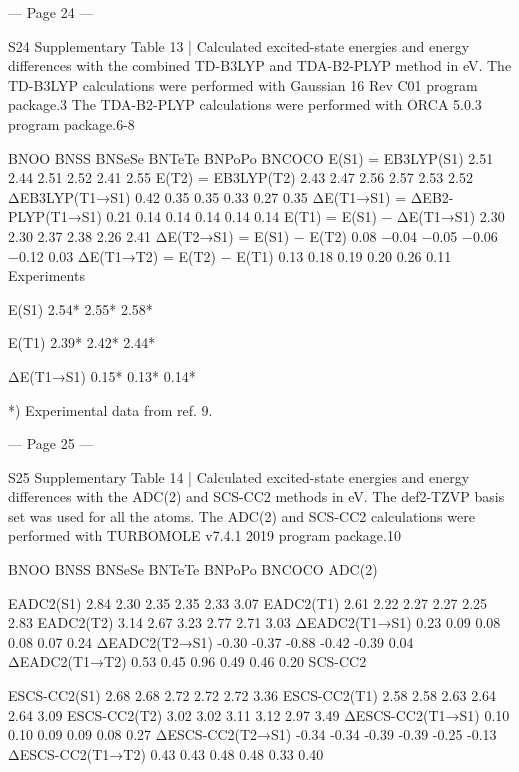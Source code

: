  
 


--- Page 24 ---
 
S24 
Supplementary Table 13 | Calculated excited-state energies and energy differences with 
the combined TD-B3LYP and TDA-B2-PLYP method in eV. The TD-B3LYP calculations 
were performed with Gaussian 16 Rev C01 program package.3 The TDA-B2-PLYP 
calculations were performed with ORCA 5.0.3 program package.6-8 
 
BNOO 
BNSS BNSeSe BNTeTe BNPoPo BNCOCO 
E(S1) = EB3LYP(S1) 
2.51 
2.44 
2.51 
2.52 
2.41 
2.55 
E(T2) = EB3LYP(T2) 
2.43 
2.47 
2.56 
2.57 
2.53 
2.52 
ΔEB3LYP(T1→S1) 
0.42 
0.35 
0.35 
0.33 
0.27 
0.35 
ΔE(T1→S1) = ΔEB2-PLYP(T1→S1) 
0.21 
0.14 
0.14 
0.14 
0.14 
0.14 
E(T1) = E(S1) − ΔE(T1→S1) 
2.30 
2.30 
2.37 
2.38 
2.26 
2.41 
ΔE(T2→S1) = E(S1) − E(T2) 
0.08 
−0.04 
−0.05 
−0.06 
−0.12 
0.03 
ΔE(T1→T2) = E(T2) − E(T1) 
0.13 
0.18 
0.19 
0.20 
0.26 
0.11 
Experiments 
 
 
 
 
 
 
E(S1) 
2.54* 
2.55* 
2.58* 
 
 
 
E(T1) 
2.39* 
2.42* 
2.44* 
 
 
 
ΔE(T1→S1) 
0.15* 
0.13* 
0.14* 
 
 
 
*) Experimental data from ref. 9. 
 
 


--- Page 25 ---
 
S25 
Supplementary Table 14 | Calculated excited-state energies and energy differences with 
the ADC(2) and SCS-CC2 methods in eV. The def2-TZVP basis set was used for all the 
atoms. The ADC(2) and SCS-CC2 calculations were performed with TURBOMOLE v7.4.1 
2019 program package.10 
 
BNOO 
BNSS 
BNSeSe 
BNTeTe 
BNPoPo BNCOCO 
ADC(2) 
 
 
 
 
 
 
EADC2(S1) 
2.84 
2.30 
2.35 
2.35 
2.33 
3.07 
EADC2(T1) 
2.61 
2.22 
2.27 
2.27 
2.25 
2.83 
EADC2(T2) 
3.14 
2.67 
3.23 
2.77 
2.71 
3.03 
ΔEADC2(T1→S1) 
0.23 
0.09 
0.08 
0.08 
0.07 
0.24 
ΔEADC2(T2→S1) 
-0.30 
-0.37 
-0.88 
-0.42 
-0.39 
0.04 
ΔEADC2(T1→T2) 
0.53 
0.45 
0.96 
0.49 
0.46 
0.20 
SCS-CC2 
 
 
 
 
 
 
ESCS-CC2(S1) 
2.68 
2.68 
2.72 
2.72 
2.72 
3.36 
ESCS-CC2(T1) 
2.58 
2.58 
2.63 
2.64 
2.64 
3.09 
ESCS-CC2(T2) 
3.02 
3.02 
3.11 
3.12 
2.97 
3.49 
ΔESCS-CC2(T1→S1) 
0.10 
0.10 
0.09 
0.09 
0.08 
0.27 
ΔESCS-CC2(T2→S1) 
-0.34 
-0.34 
-0.39 
-0.39 
-0.25 
-0.13 
ΔESCS-CC2(T1→T2) 
0.43 
0.43 
0.48 
0.48 
0.33 
0.40 
 
